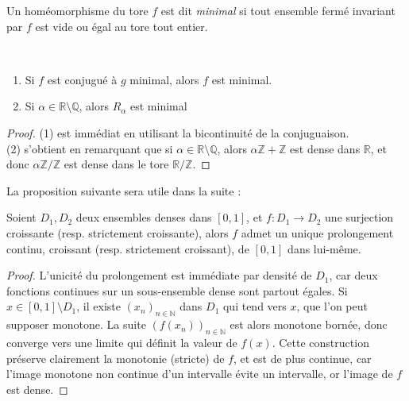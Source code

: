 \documentclass[11pt,a4paper]{article}
\begin{document}
\begin{defin} 
Un homéomorphisme du tore $f$ est dit \textit{minimal} si tout ensemble fermé invariant par  $f$ est vide ou égal au tore tout entier. 
\end{defin}


\begin{prop}\label{minimal} ~
\begin{enumerate}
\item Si $f$ est conjugué à $g$ minimal, alors $f$ est minimal.
\item Si $\alpha \in \mathbb{R} \setminus \mathbb{Q}$, alors $R_\alpha$ est minimal
\end{enumerate}
\end{prop}

\begin{proof}
(1) est immédiat en utilisant la bicontinuité de la conjuguaison. \\
(2) s'obtient en remarquant que si $\alpha \in \mathbb{R} \setminus \mathbb{Q}$, alors $\alpha\mathbb{Z} + \mathbb{Z}$ est dense dans $\mathbb{R}$, et donc $\alpha\mathbb{Z}/\mathbb{Z}$ est dense dans le tore $\mathbb{R}/\mathbb{Z}$. 
\end{proof}

La proposition suivante sera utile dans la suite :


\begin{prop}\label{dense}
Soient $D_1,D_2$ deux ensembles denses dans $[0,1]$, et $f : D_1 \to D_2$ une surjection croissante (resp. strictement croissante), alors $f$ admet un unique prolongement continu, croissant (resp. strictement croissant), de $[0,1]$ dans lui-même.
\end{prop}

\begin{proof}
L'unicité du prolongement est immédiate par densité de $D_1$, car deux fonctions continues sur un sous-ensemble dense sont partout égales. Si $x\in [0,1]\setminus D_1$, il existe $(x_n)_{n\in \mathbb{N}}$ dans $D_1$ qui tend vers $x$, que l'on peut supposer monotone. La suite $(f(x_n))_{n\in\mathbb{N}}$ est alors monotone bornée, donc converge vers une limite qui définit la valeur de $f(x)$.
Cette construction préserve clairement la monotonie (stricte) de $f$, et est de plus continue, car l'image monotone non continue d'un intervalle évite un intervalle, or l'image de $f$ est dense. 
\end{proof} 
\end{document}
